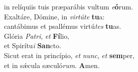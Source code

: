\evenverse in relíquiis tuis præparábis vultum \textit{e}\textbf{ó}rum.\\
\oddverse Exaltáre, Dómine, in \textit{vir}\textit{tú}\textit{te} \textbf{tu}a:~\*\\
\oddverse cantábimus et psallémus virtú\textit{tes} \textbf{tu}as.\\
\evenverse Glória \textit{Pa}\textit{tri}, \textit{et} \textbf{Fí}lio,~\*\\
\evenverse et Spirítu\textit{i} \textbf{San}cto.\\
\oddverse Sicut erat in princípio, \textit{et} \textit{nunc}, \textit{et} \textbf{sem}per,~\*\\
\oddverse et in sǽcula sæculó\textit{rum}. \textbf{A}men.\\

